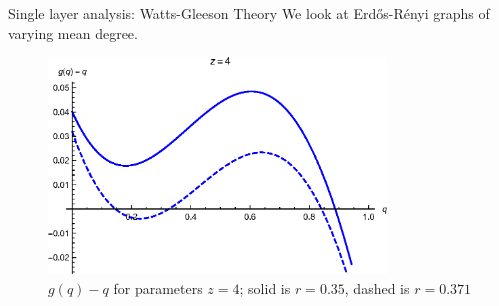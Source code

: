 \documentclass[10pt, xcolor=dvipsnames]{beamer}
\begin{document}
\begin{frame}{Single layer analysis: Watts-Gleeson Theory}
We look at Erdős-Rényi graphs of varying mean degree.
\begin{figure}[htb]
\includegraphics[width=0.8\textwidth]{figures/single_layer_gq}
\caption{$g(q)-q$ for parameters $z=4$;  solid is $r=0.35$, dashed is $r=0.371$}
\end{figure}

\end{frame}
\end{document}
